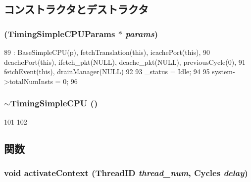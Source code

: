 \subsection{コンストラクタとデストラクタ}
\hypertarget{classTimingSimpleCPU_a6d8b5c088e0456abaaf000e46e346319}{
\subsubsection[{TimingSimpleCPU}]{ (TimingSimpleCPUParams $\ast$ {\em params})}}
\label{classTimingSimpleCPU_a6d8b5c088e0456abaaf000e46e346319}



\begin{DoxyCode}
89     : BaseSimpleCPU(p), fetchTranslation(this), icachePort(this),
90       dcachePort(this), ifetch_pkt(NULL), dcache_pkt(NULL), previousCycle(0),
91       fetchEvent(this), drainManager(NULL)
92 {
93     _status = Idle;
94 
95     system->totalNumInsts = 0;
96 }
\end{DoxyCode}
\hypertarget{classTimingSimpleCPU_a637e8aedb9fa159bd5480f48e6574832}{
\subsubsection[{$\sim$TimingSimpleCPU}]{\setlength{\rightskip}{0pt plus 5cm}$\sim${\bf TimingSimpleCPU} ()}}
\label{classTimingSimpleCPU_a637e8aedb9fa159bd5480f48e6574832}



\begin{DoxyCode}
101 {
102 }
\end{DoxyCode}


\subsection{関数}
\hypertarget{classTimingSimpleCPU_ad7a501b28bdbe8b3e708cd1ef69ac191}{
\subsubsection[{activateContext}]{\setlength{\rightskip}{0pt plus 5cm}void activateContext ({\bf ThreadID} {\em thread\_\-num}, \/  {\bf Cycles} {\em delay})}}
\label{classTimingSimpleCPU_ad7a501b28bdbe8b3e708cd1ef69ac191}



